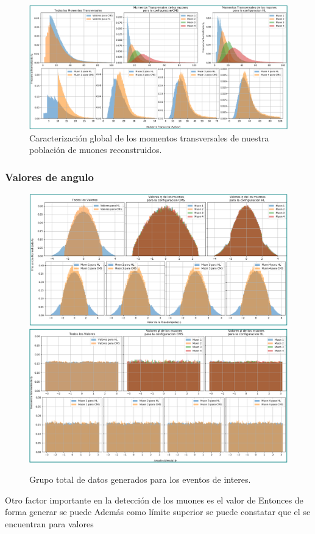\begin{figure}[!ht]
\centering
\includegraphics[width=.8\textwidth]{Simulacion/imagenes/Datos_PT_ALL.png}
\caption{Caracterización global de los momentos transversales de nuestra población de muones reconstruidos.}
\label{procesos_darksusy_PTyISO}
\end{figure}



\subsubsection{Valores de angulo}
\begin{figure}[!ht]
\centering
\includegraphics[width=.8\textwidth]{Simulacion/imagenes/Datos_Eta_ALL.png}
\includegraphics[width=.8\textwidth]{Simulacion/imagenes/Datos_Phi_ALL.png}
\caption{Grupo total de datos generados para los eventos de interes.}
\label{procesos_darksusy_ETAyPHI}
\end{figure}





Otro factor importante en la detección de los muones es el valor de Entonces de forma generar se puede Además como límite superior se puede constatar que el  se encuentran para valores 



















